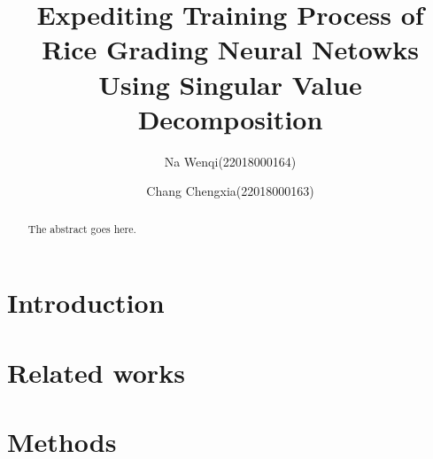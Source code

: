 \documentclass[12pt,a4paper]{article}
\begin{document}

\title{Expediting Training Process of Rice Grading Neural Netowks Using Singular Value Decomposition}
\author[*]{Na Wenqi(22018000164)}
\author[*]{Chang Chengxia(22018000163)}
\date{}

\maketitle

\begin{abstract}
The abstract goes here.
\end{abstract}

\section{Introduction}

\section{Related works}

\section{Methods}
\end{document}
